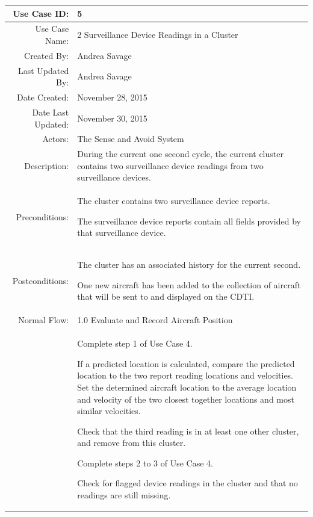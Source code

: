 \documentclass[12pt,oneside,letterpaper]{article}
\newenvironment{packed_enumerate}{ %
\vspace{-7mm}
\begin{enumerate}
  \setlength{\itemsep}{0pt}
  \setlength{\parskip}{0pt}
  \setlength{\parsep}{0pt}
}{\end{enumerate}
\vspace{-8mm}}
\begin{document}
\begin{longtable}{|r|p{3.8in}|}
\hline
Use Case ID:&5\\
\hline
Use Case Name:&2 Surveillance Device Readings in a Cluster\\
\hline
Created By:&Andrea Savage\\
\hline
Last Updated By:&Andrea Savage\\
\hline
Date Created:&November 28, 2015\\
\hline
Date Last Updated:&November 30, 2015\\
\hline
Actors:&The Sense and Avoid System\\
\hline
Description:&During the current one second cycle, the current cluster contains two surveillance device readings from two surveillance devices.\\
\hline
Preconditions:&
\begin{packed_enumerate}
\item The cluster contains two surveillance device reports.
\item The surveillance device reports contain all fields provided by that surveillance device.
\end{packed_enumerate}\\
\hline
Postconditions: &
\begin{packed_enumerate}
\item The cluster has an associated history for the current second.
\item One new aircraft has been added to the collection of aircraft that will be sent to and displayed on the CDTI.
\end{packed_enumerate}\\
\hline
Normal Flow:&1.0  Evaluate and Record Aircraft Position \\
&  %
\begin{packed_enumerate}
\item Complete step 1 of Use Case 4.
\item If a predicted location is calculated, compare the predicted location to the two report reading locations and velocities. Set the determined aircraft location to the average location and velocity of the two closest together locations and most similar velocities.
\item Check that the third reading is in at least one other cluster, and remove from this cluster.
\item Complete steps 2 to 3 of Use Case 4.
\item Check for flagged device readings in the cluster and that no readings are still missing.

\end{packed_enumerate}
\end{longtable}
\end{document}

